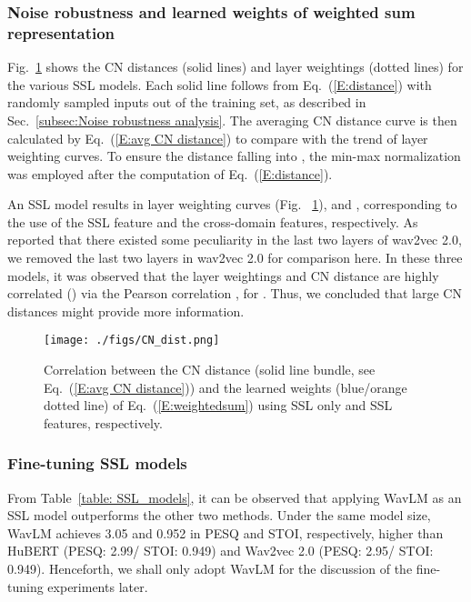 \documentclass[a4paper]{article}
\begin{document}
\subsubsection{Noise robustness and learned weights of weighted sum representation}\label{subsec: Noise robustness}
Fig.~\ref{fig:CN_dist} shows the CN distances (solid lines) and layer weightings (dotted lines) for the various SSL models. Each solid line
follows from Eq.~(\ref{E:distance}) with randomly sampled inputs  out of the training set, as described in Sec.~\ref{subsec:Noise robustness analysis}. The averaging CN distance curve is then calculated by Eq.~(\ref{E:avg CN distance}) to compare with the trend of layer weighting curves. To ensure the distance  falling into , the min-max normalization was employed after the computation of Eq.~(\ref{E:distance}).






An SSL model  results in layer weighting curves (Fig. ~\ref{fig:CN_dist}),  and , corresponding to the use of the SSL feature and the cross-domain features, respectively.
As \cite{9688093} reported that there existed some peculiarity in the last two layers of wav2vec 2.0, we removed the last two layers in wav2vec 2.0 for comparison here. In these three models, it was observed that the layer weightings and CN distance  are highly correlated () via the Pearson correlation , for . Thus, we concluded that large CN distances might provide more information.



\begin{figure}[ht]
  \centering
  \texttt{[image: ./figs/CN\_dist.png]}
  \caption{Correlation between the CN distance (solid line bundle, see Eq.~(\ref{E:avg CN distance})) and the learned weights  (blue/orange dotted line) of Eq.~(\ref{E:weightedsum}) using SSL only and SSL  features, respectively.}
  \label{fig:CN_dist}
\end{figure}


\subsubsection{Fine-tuning SSL models}
From Table~\ref{table: SSL_models}, it can be observed that applying WavLM as an SSL model outperforms the other two methods. Under the same model size, WavLM achieves 3.05 and 0.952 in PESQ and STOI, respectively, higher than HuBERT (PESQ: 2.99/ STOI: 0.949) and Wav2vec 2.0 (PESQ: 2.95/ STOI: 0.949). Henceforth, we shall only adopt WavLM for the discussion of the fine-tuning experiments later.
\end{document}
